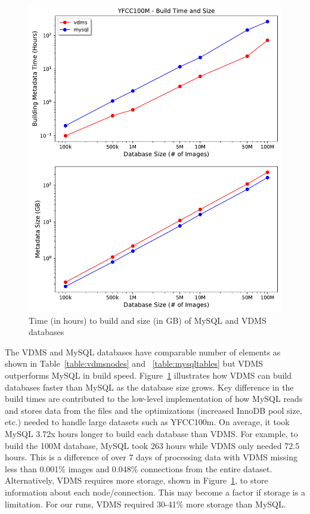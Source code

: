 \begin{figure}[]
\centering
\includegraphics[width=\columnwidth]{figures/db_time_size}
\caption{Time (in hours) to build and size (in GB) of MySQL and VDMS databases}
\label{fig:db_time_size}
\end{figure}

The VDMS and MySQL databases have comparable number of elements as shown in Table~\ref{table:vdmsnodes} and ~\ref{table:mysqltables} but VDMS outperforms MySQL in build speed.  Figure~\ref{fig:db_time_size} illustrates how VDMS can build databases faster than MySQL as the database size grows.  Key difference in the build times are contributed to the low-level implementation of how MySQL reads and stores data from the files and the optimizations (increased InnoDB pool size, etc.) needed to handle large datasets such as YFCC100m.  On average, it took MySQL 3.72x hours longer to build each database than VDMS. For example, to build the 100M database, MySQL took 263 hours while VDMS only needed 72.5 hours.  This is a difference of over 7 days of processing data with VDMS missing less than 0.001\% images and 0.048\% connections from the entire dataset.  Alternatively, VDMS requires more storage, shown in Figure~\ref{fig:db_time_size}, to store information about each node/connection.  This may become a factor if storage is a limitation.  For our runs, VDMS required 30-41\% more storage than MySQL.


